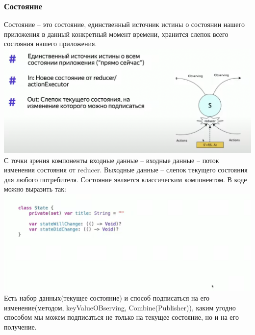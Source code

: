 \documentclass{article}
\begin{document}
    \subsubsection{Состояние}
    Состояние -- это состояние, единственный источник истины о состоянии нашего приложения в данный конкретный момент времени, хранится слепок всего состояния нашего приложения. 
    \newline
    \includegraphics[scale = 0.5]{pic/Снимок экрана 2023-07-30 в 21.44.29.png}
    \newline
    С точки зрения компоненты входные данные -- входные данные -- поток изменения состояния от reducer. Выходные данные -- слепок текущего состояния для любого потребителя. 
    \newline
    Состояние является классическим компонентом. В коде можно выразить так: 
    \newline
    \includegraphics[scale = 0.5]{pic/Снимок экрана 2023-07-30 в 21.46.06.png}
    \newline
    Есть набор данных(текущее состояние) и способ подписаться на его изменение(методом, keyValueOBserving, Combine(Publisher)), каким угодно способом мы можем подписаться не только на текущее состояние, но и на его получение. 
\end{document}
